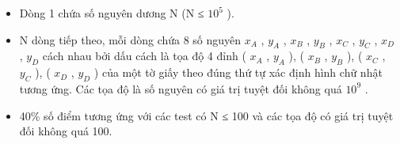 \begin{itemize}
	\item     Dòng 1 chứa số nguyên dương N (N ≤ $10^{5}$    ).   
	\item     N dòng tiếp theo, mỗi dòng chứa 8 số nguyên $x_{A}$    , $y_{A}$    , $x_{B}$    , $y_{B}$    , $x_{C}$    , $y_{C}$    , $x_{D}$    , $y_{D}$    cách nhau bởi dấu cách là tọa độ 4 đỉnh (         $x_{A}$     , $y_{A}$     ), (           $x_{B}$      , $y_{B}$     ), (           $x_{C}$      , $y_{C}$     ), (           $x_{D}$      , $y_{D}$     ) của một tờ giấy theo đúng thứ tự xác định hình chữ nhật tương ứng. Các tọa độ là số nguyên có giá trị tuyệt đối không quá $10^{9}$     .    
	\item      40\% số điểm tương ứng với các test có N         ≤ 100 và các tọa độ có giá trị tuyệt đối không quá 100.    
\end{itemize}